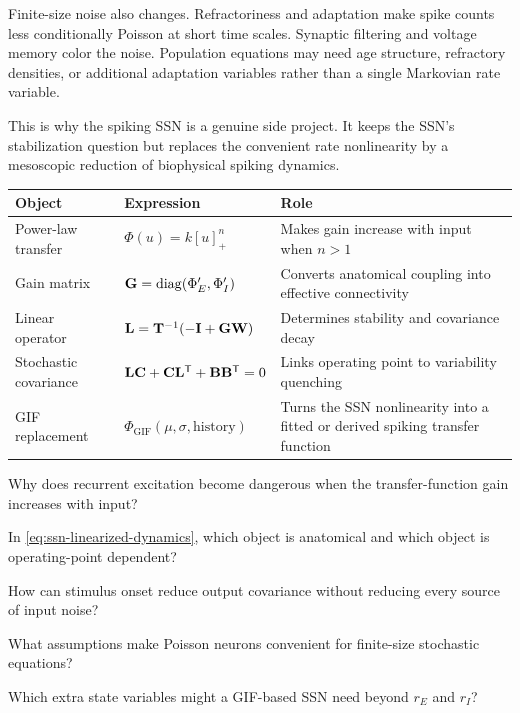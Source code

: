Finite-size noise also changes. Refractoriness and adaptation make spike counts less conditionally Poisson at short time scales. Synaptic filtering and voltage memory color the noise. Population equations may need age structure, refractory densities, or additional adaptation variables rather than a single Markovian rate variable.

This is why the spiking SSN is a genuine side project. It keeps the SSN's stabilization question but replaces the convenient rate nonlinearity by a mesoscopic reduction of biophysical spiking dynamics.

\begin{chaptersummary}
\begin{center}
\renewcommand{\arraystretch}{1.5}
\begin{tabularx}{\textwidth}{@{}l X X@{}}
  \toprule
  \textbf{Object} & \textbf{Expression} & \textbf{Role} \\
  \midrule
  Power-law transfer &
  $\Phi(u)=k[u]_{+}^{n}$ &
  Makes gain increase with input when $n>1$ \\
  Gain matrix &
  $\mathbf{G}=\operatorname{diag}(\Phi'_E,\Phi'_I)$ &
  Converts anatomical coupling into effective connectivity \\
  Linear operator &
  $\mathbf{L}=\mathbf{T}^{-1}(-\mathbf{I}+\mathbf{G}\mathbf{W})$ &
  Determines stability and covariance decay \\
  Stochastic covariance &
  $\mathbf{L}\mathbf{C}+\mathbf{C}\mathbf{L}^{\mathsf T}+\mathbf{B}\mathbf{B}^{\mathsf T}=0$ &
  Links operating point to variability quenching \\
  GIF replacement &
  $\Phi_{\mathrm{GIF}}(\mu,\sigma,\text{history})$ &
  Turns the SSN nonlinearity into a fitted or derived spiking transfer function \\
  \bottomrule
\end{tabularx}
\end{center}
\end{chaptersummary}

\begin{conceptquestions}
  \item Why does recurrent excitation become dangerous when the transfer-function gain increases with input?
  \item In \eqref{eq:ssn-linearized-dynamics}, which object is anatomical and which object is operating-point dependent?
  \item How can stimulus onset reduce output covariance without reducing every source of input noise?
  \item What assumptions make Poisson neurons convenient for finite-size stochastic equations?
  \item Which extra state variables might a GIF-based SSN need beyond $r_E$ and $r_I$?
\end{conceptquestions}
